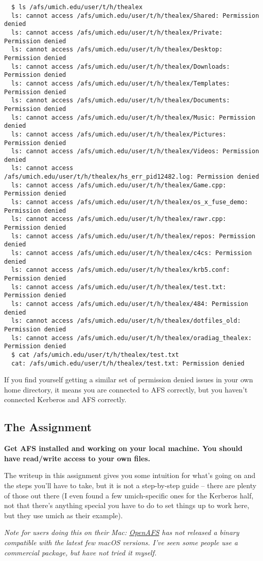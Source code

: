 \documentclass{article}
\begin{document}
\begin{lstlisting}
  $ ls /afs/umich.edu/user/t/h/thealex
  ls: cannot access /afs/umich.edu/user/t/h/thealex/Shared: Permission denied
  ls: cannot access /afs/umich.edu/user/t/h/thealex/Private: Permission denied
  ls: cannot access /afs/umich.edu/user/t/h/thealex/Desktop: Permission denied
  ls: cannot access /afs/umich.edu/user/t/h/thealex/Downloads: Permission denied
  ls: cannot access /afs/umich.edu/user/t/h/thealex/Templates: Permission denied
  ls: cannot access /afs/umich.edu/user/t/h/thealex/Documents: Permission denied
  ls: cannot access /afs/umich.edu/user/t/h/thealex/Music: Permission denied
  ls: cannot access /afs/umich.edu/user/t/h/thealex/Pictures: Permission denied
  ls: cannot access /afs/umich.edu/user/t/h/thealex/Videos: Permission denied
  ls: cannot access /afs/umich.edu/user/t/h/thealex/hs_err_pid12482.log: Permission denied
  ls: cannot access /afs/umich.edu/user/t/h/thealex/Game.cpp: Permission denied
  ls: cannot access /afs/umich.edu/user/t/h/thealex/os_x_fuse_demo: Permission denied
  ls: cannot access /afs/umich.edu/user/t/h/thealex/rawr.cpp: Permission denied
  ls: cannot access /afs/umich.edu/user/t/h/thealex/repos: Permission denied
  ls: cannot access /afs/umich.edu/user/t/h/thealex/c4cs: Permission denied
  ls: cannot access /afs/umich.edu/user/t/h/thealex/krb5.conf: Permission denied
  ls: cannot access /afs/umich.edu/user/t/h/thealex/test.txt: Permission denied
  ls: cannot access /afs/umich.edu/user/t/h/thealex/484: Permission denied
  ls: cannot access /afs/umich.edu/user/t/h/thealex/dotfiles_old: Permission denied
  ls: cannot access /afs/umich.edu/user/t/h/thealex/oradiag_thealex: Permission denied
  $ cat /afs/umich.edu/user/t/h/thealex/test.txt
  cat: /afs/umich.edu/user/t/h/thealex/test.txt: Permission denied
\end{lstlisting}

If you find yourself getting a similar set of permission denied issues in your
own home directory, it means you are connected to AFS correctly, but you
haven't connected Kerberos and AFS correctly.


\subsection*{The Assignment}

\textbf{Get AFS installed and working on your local machine. You should have
read/write access to your own files.}

The writeup in this assignment gives you some intuition for what's going on
and the steps you'll have to take, but it is not a step-by-step guide -- there
are plenty of those out there (I even found a few umich-specific ones for the
Kerberos half, not that there's anything special you have to do to set things
up to work here, but they use umich as their example).

\emph{Note for users doing this on their Mac:
\href{https://www.openafs.org/}{OpenAFS} has not released a binary compatible
with the latest few macOS versions. I've seen some people use a commercial
package, but have not tried it myself.}
\end{document}
